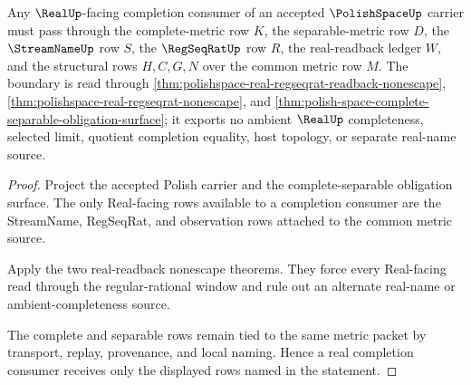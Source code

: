 \begin{theorem}
\label{thm:polishspace-real-completion-consumer-boundary}
Any $\RealUp$-facing completion consumer of an accepted $\PolishSpaceUp$ carrier must pass through the complete-metric row $K$, the separable-metric row $D$, the $\StreamNameUp$ row $S$, the $\RegSeqRatUp$ row $R$, the real-readback ledger $W$, and the structural rows $H,C,G,N$ over the common metric row $M$. The boundary is read through \autoref{thm:polishspace-real-regseqrat-readback-nonescape}, \autoref{thm:polishspace-real-regseqrat-nonescape}, and \autoref{thm:polish-space-complete-separable-obligation-surface}; it exports no ambient $\RealUp$ completeness, selected limit, quotient completion equality, host topology, or separate real-name source.
\end{theorem}
\begin{proof}
Project the accepted Polish carrier and the complete-separable obligation surface. The only Real-facing rows available to a completion consumer are the StreamName, RegSeqRat, and observation rows attached to the common metric source.

Apply the two real-readback nonescape theorems. They force every Real-facing read through the regular-rational window and rule out an alternate real-name or ambient-completeness source.

The complete and separable rows remain tied to the same metric packet by transport, replay, provenance, and local naming. Hence a real completion consumer receives only the displayed rows named in the statement.
\end{proof}


